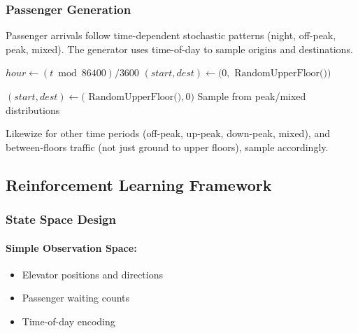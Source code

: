 \documentclass[10pt,twocolumn]{article}
\begin{document}
\subsubsection{Passenger Generation}

Passenger arrivals follow time-dependent stochastic patterns (night, off-peak, peak, mixed).  
The generator uses time-of-day to sample origins and destinations.

\begin{algorithm}[h!]
\caption{Time-Dependent Passenger Generation}
\begin{algorithmic}[1]
\State $hour \gets (t \bmod 86400)/3600$
 
            \State $(start, dest) \gets (0,$
            \Statex \hspace{\algorithmicindent} $\text{RandomUpperFloor()})$

        \Else
            \State $(start, dest) \gets ($
            \Statex \hspace{\algorithmicindent} $\text{RandomUpperFloor()}, 0)$
        \EndIf
    \EndIf
\Else
    \State Sample from peak/mixed distributions
\EndIf
\end{algorithmic}
\end{algorithm}

Likewize for other time periods (off-peak, up-peak, down-peak, mixed), and between-floors traffic (not just ground to upper floors), sample accordingly.

\subsection{Reinforcement Learning Framework}

\subsubsection{State Space Design}

\paragraph{Simple Observation Space:}
\begin{itemize}
    \item Elevator positions and directions
    \item Passenger waiting counts
    \item Time-of-day encoding
\end{itemize}
\end{document}
